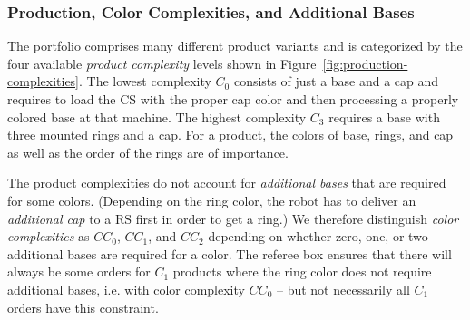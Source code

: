 \documentclass[12pt,twoside]{article}
\newcommand{\reffig}[1]{Figure~\ref{#1}}
\begin{document}
\subsubsection{Production, Color Complexities, and Additional Bases}
\label{sec:production-complexities}
The portfolio comprises many different product variants and is
categorized by the four available \emph{product complexity} levels
shown in \reffig{fig:production-complexities}. The lowest complexity
$C_0$ consists of just a base and a cap and requires to load the CS
with the proper cap color and then processing a properly colored base
at that machine. The highest complexity $C_3$ requires a base with
three mounted rings and a cap. For a product, the colors of base,
rings, and cap as well as the order of the rings are of importance.

The product complexities do not account for \emph{additional bases}
that are required for some colors. (Depending on the ring color, the 
robot has to deliver an \emph{additional cap} to a RS first in order 
to get a ring.) 
We therefore distinguish \emph{color complexities} as $CC_0$, $CC_1$, 
and $CC_2$ depending on whether zero, one, or two additional bases are 
required for a color. The referee box ensures that there will always be 
some orders for $C_1$ products where the ring color does not require 
additional bases, i.e. with color complexity $CC_0$ -- but not necessarily 
all $C_1$ orders have this constraint.
\end{document}
